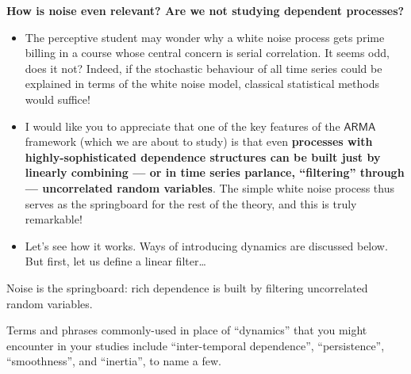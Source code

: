 \documentclass[
  letterpaper,
  DIV=11,
  numbers=noendperiod]{scrartcl}
\newcommand{\slidelabel}[1]{{\color{embernavy}\bfseries\large #1\par\vspace{5pt}}}
\newenvironment{slidefooter}{%
  \par\vspace{7pt}{\color{emberrule}\rule{\linewidth}{0.4pt}}\par\vspace{4pt}%
  \color{emberamber}\itshape\small}{\par}
\begin{document}
\begin{slidebox}

\slidelabel{How is noise even relevant? Are we not studying dependent
processes?}

\begin{itemize}
\item
  The perceptive student may wonder why a white noise process gets prime
  billing in a course whose central concern is serial correlation. It
  seems odd, does it not? Indeed, if the stochastic behaviour of all
  time series could be explained in terms of the white noise model,
  classical statistical methods would suffice!
\item
  I would like you to appreciate that one of the key features of the
  \(\mathsf{ARMA}\) framework (which we are about to study) is that even
  \textbf{processes with highly-sophisticated dependence structures can
  be built just by linearly combining --- or in time series parlance,
  ``filtering'' through --- uncorrelated random variables}. The simple
  white noise process thus serves as the springboard for the rest of the
  theory, and this is truly remarkable!
\item
  Let's see how it works. Ways of introducing dynamics are discussed
  below. But first, let us define a linear filter\ldots{}
\end{itemize}

\begin{slidefooter}

Noise is the springboard: rich dependence is built by filtering
uncorrelated random variables.

\end{slidefooter}

\end{slidebox}

Terms and phrases commonly-used in place of ``dynamics'' that you might
encounter in your studies include ``inter-temporal dependence'',
``persistence'', ``smoothness'', and ``inertia'', to name a few.
\end{document}
